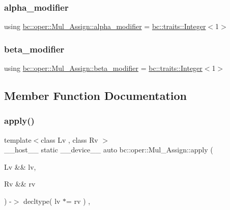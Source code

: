 \subsubsection{\texorpdfstring{alpha\+\_\+modifier}{alpha\_modifier}}
{\footnotesize\ttfamily using \hyperlink{structbc_1_1oper_1_1Mul__Assign_abf4ebe5753ac6898767c813ef20e213b}{bc\+::oper\+::\+Mul\+\_\+\+Assign\+::alpha\+\_\+modifier} =  \hyperlink{structbc_1_1traits_1_1Integer}{bc\+::traits\+::\+Integer}$<$1$>$}

\mbox{\label{structbc_1_1oper_1_1Mul__Assign_a329696cc706b6b989d80866e2369c8e1}} 
\subsubsection{\texorpdfstring{beta\+\_\+modifier}{beta\_modifier}}
{\footnotesize\ttfamily using \hyperlink{structbc_1_1oper_1_1Mul__Assign_a329696cc706b6b989d80866e2369c8e1}{bc\+::oper\+::\+Mul\+\_\+\+Assign\+::beta\+\_\+modifier} =  \hyperlink{structbc_1_1traits_1_1Integer}{bc\+::traits\+::\+Integer}$<$1$>$}



\subsection{Member Function Documentation}
\mbox{\label{structbc_1_1oper_1_1Mul__Assign_a978e562d5cf0e2edc19854a626e1d40e}} 
\subsubsection{\texorpdfstring{apply()}{apply()}}
{\footnotesize\ttfamily template$<$class Lv , class Rv $>$ \\
\+\_\+\+\_\+host\+\_\+\+\_\+ static \+\_\+\+\_\+device\+\_\+\+\_\+ auto bc\+::oper\+::\+Mul\+\_\+\+Assign\+::apply (\begin{DoxyParamCaption}\item[{Lv \&\&}]{lv,  }\item[{Rv \&\&}]{rv }\end{DoxyParamCaption}) -\/$>$ decltype( lv $\ast$= rv ) \hspace{0.3cm}{\ttfamily [inline]}, {\ttfamily [static]}}

